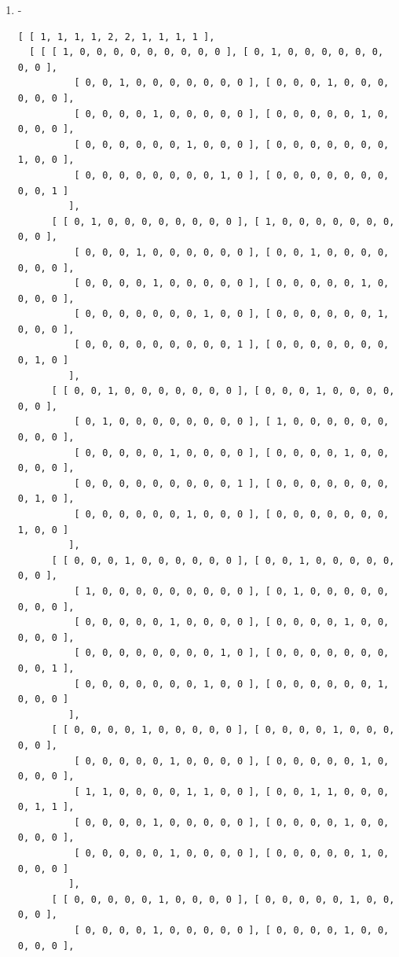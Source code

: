 \documentclass[a4paper, 10pt]{book}
\theoremstyle{definition}
\numberwithin{equation}{chapter}
\begin{document}
\begin{appendices}
\begin{enumerate}
\begin{lstlisting}[numbers=none]
          [ 0, 0, 0, 0, 0, 1, 0, 0, 0, 0 ], [ 0, 0, 0, 0, 1, 0, 0, 0, 0, 0 ],
          [ 0, 0, 1, 0, 0, 0, 0, 0, 0, 0 ], [ 0, 0, 0, 1, 0, 0, 0, 0, 0, 0 ],
          [ 1, 0, 0, 0, 0, 0, 0, 0, 0, 0 ], [ 0, 1, 0, 0, 0, 0, 0, 0, 0, 0 ] 
         ] ] ]
	\end{lstlisting}
	\item -\begin{lstlisting}[numbers=none]
	[ [ 1, 1, 1, 1, 2, 2, 1, 1, 1, 1 ], 
  [ [ [ 1, 0, 0, 0, 0, 0, 0, 0, 0, 0 ], [ 0, 1, 0, 0, 0, 0, 0, 0, 0, 0 ], 
          [ 0, 0, 1, 0, 0, 0, 0, 0, 0, 0 ], [ 0, 0, 0, 1, 0, 0, 0, 0, 0, 0 ],
          [ 0, 0, 0, 0, 1, 0, 0, 0, 0, 0 ], [ 0, 0, 0, 0, 0, 1, 0, 0, 0, 0 ],
          [ 0, 0, 0, 0, 0, 0, 1, 0, 0, 0 ], [ 0, 0, 0, 0, 0, 0, 0, 1, 0, 0 ],
          [ 0, 0, 0, 0, 0, 0, 0, 0, 1, 0 ], [ 0, 0, 0, 0, 0, 0, 0, 0, 0, 1 ] 
         ], 
      [ [ 0, 1, 0, 0, 0, 0, 0, 0, 0, 0 ], [ 1, 0, 0, 0, 0, 0, 0, 0, 0, 0 ], 
          [ 0, 0, 0, 1, 0, 0, 0, 0, 0, 0 ], [ 0, 0, 1, 0, 0, 0, 0, 0, 0, 0 ],
          [ 0, 0, 0, 0, 1, 0, 0, 0, 0, 0 ], [ 0, 0, 0, 0, 0, 1, 0, 0, 0, 0 ],
          [ 0, 0, 0, 0, 0, 0, 0, 1, 0, 0 ], [ 0, 0, 0, 0, 0, 0, 1, 0, 0, 0 ],
          [ 0, 0, 0, 0, 0, 0, 0, 0, 0, 1 ], [ 0, 0, 0, 0, 0, 0, 0, 0, 1, 0 ] 
         ], 
      [ [ 0, 0, 1, 0, 0, 0, 0, 0, 0, 0 ], [ 0, 0, 0, 1, 0, 0, 0, 0, 0, 0 ], 
          [ 0, 1, 0, 0, 0, 0, 0, 0, 0, 0 ], [ 1, 0, 0, 0, 0, 0, 0, 0, 0, 0 ],
          [ 0, 0, 0, 0, 0, 1, 0, 0, 0, 0 ], [ 0, 0, 0, 0, 1, 0, 0, 0, 0, 0 ],
          [ 0, 0, 0, 0, 0, 0, 0, 0, 0, 1 ], [ 0, 0, 0, 0, 0, 0, 0, 0, 1, 0 ],
          [ 0, 0, 0, 0, 0, 0, 1, 0, 0, 0 ], [ 0, 0, 0, 0, 0, 0, 0, 1, 0, 0 ] 
         ], 
      [ [ 0, 0, 0, 1, 0, 0, 0, 0, 0, 0 ], [ 0, 0, 1, 0, 0, 0, 0, 0, 0, 0 ], 
          [ 1, 0, 0, 0, 0, 0, 0, 0, 0, 0 ], [ 0, 1, 0, 0, 0, 0, 0, 0, 0, 0 ],
          [ 0, 0, 0, 0, 0, 1, 0, 0, 0, 0 ], [ 0, 0, 0, 0, 1, 0, 0, 0, 0, 0 ],
          [ 0, 0, 0, 0, 0, 0, 0, 0, 1, 0 ], [ 0, 0, 0, 0, 0, 0, 0, 0, 0, 1 ],
          [ 0, 0, 0, 0, 0, 0, 0, 1, 0, 0 ], [ 0, 0, 0, 0, 0, 0, 1, 0, 0, 0 ] 
         ], 
      [ [ 0, 0, 0, 0, 1, 0, 0, 0, 0, 0 ], [ 0, 0, 0, 0, 1, 0, 0, 0, 0, 0 ], 
          [ 0, 0, 0, 0, 0, 1, 0, 0, 0, 0 ], [ 0, 0, 0, 0, 0, 1, 0, 0, 0, 0 ],
          [ 1, 1, 0, 0, 0, 0, 1, 1, 0, 0 ], [ 0, 0, 1, 1, 0, 0, 0, 0, 1, 1 ],
          [ 0, 0, 0, 0, 1, 0, 0, 0, 0, 0 ], [ 0, 0, 0, 0, 1, 0, 0, 0, 0, 0 ],
          [ 0, 0, 0, 0, 0, 1, 0, 0, 0, 0 ], [ 0, 0, 0, 0, 0, 1, 0, 0, 0, 0 ] 
         ], 
      [ [ 0, 0, 0, 0, 0, 1, 0, 0, 0, 0 ], [ 0, 0, 0, 0, 0, 1, 0, 0, 0, 0 ], 
          [ 0, 0, 0, 0, 1, 0, 0, 0, 0, 0 ], [ 0, 0, 0, 0, 1, 0, 0, 0, 0, 0 ],

\end{lstlisting}
\end{enumerate}
\end{appendices}
\end{document}
